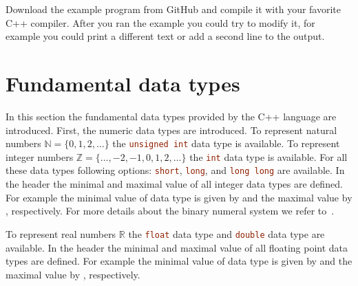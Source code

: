 

\begin{exercise}
Download the example program from GitHub and compile it with your favorite C++ compiler. After you ran the example you could try to modify it, for example you could print a different text or add a second line to the output.
\end{exercise}


\section{Fundamental data types}
In this section the fundamental data types provided by the C++ language are introduced. First, the numeric data types are introduced. To represent natural numbers $\mathbb{N}=\{0,1,2,\ldots \}$ the \lstinline[language=C++]|unsigned int| data type is available. To represent integer numbers $\mathbb{Z}=\{\ldots,-2,-1,0,1,2,\ldots \}$ the \lstinline[language=C++]|int| data type is available. For all these data types following options: \lstinline[language=C++]|short|, \lstinline[language=C++]|long|, and \lstinline[language=C++]|long long| are available. In the  header the minimal and maximal value of all integer data types are defined. For example the minimal value of  data type is given by  and the maximal value by , respectively. For more details about the binary numeral system we refer to~\cite{gilli1965binary}. 

To represent real numbers $\mathbb{R}$ the \lstinline[language=C++]|float| data type and \lstinline[language=C++]|double| data type are available. In the  header the minimal and maximal value of all floating point data types are defined. For example the minimal value of  data type is given by  and the maximal value by , respectively. 

